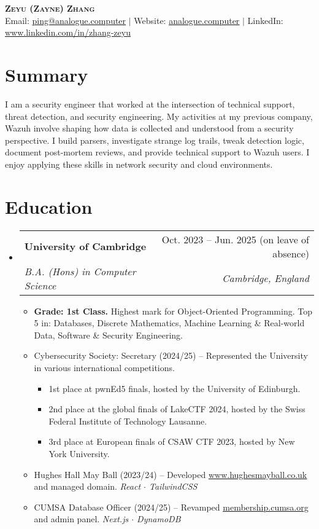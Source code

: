 \documentclass[letterpaper,10pt]{article}
\makeatletter
\newcommand{\link}[2]{\href{#1}{\color{blue}\underline{#2}}}
\newcommand{\resumeItem}[1]{
  \item\small{
    {#1 \vspace{-2pt}}
  }
}
\newcommand{\resumeSubheading}[4]{
  \vspace{-2pt}\item
  \begin{tabular*}{0.97\textwidth}[t]{l@{\extracolsep{\fill}}r}
    \textbf{#1} & #2 \\
    \textit{\small#3} & \textit{\small #4} \\
  \end{tabular*}\vspace{-7pt}
}
\newenvironment{resumeSubHeadingList}{\begin{itemize}[leftmargin=0.15in, label={}]}{\end{itemize}}
\newenvironment{resumeItemList}{\begin{itemize}}{\end{itemize}}
\newenvironment{resumeItemSubList}{\begin{itemize}\setlength\itemsep{0.4em}}{\end{itemize}\vspace{-5pt}}
\makeatother
\begin{document}
\begin{center}
  \textbf{\huge \scshape Zeyu (Zayne) Zhang} \\ \vspace{1pt}
  \small Email: \link{mailto:ping@analogue.computer}{ping@analogue.computer} $|$ Website: \link{https://www.analogue.computer}{analogue.computer} $|$ LinkedIn: \link{https://www.linkedin.com/in/zhang-zeyu}{www.linkedin.com/in/zhang-zeyu}
\end{center}

\section{Summary}
I am a security engineer that worked at the intersection of technical support, threat detection, and security engineering. My activities
at my previous company, Wazuh involve shaping how data is collected and understood from a security perspective. I build parsers, investigate
strange log trails, tweak detection logic, document post-mortem reviews, and provide technical support to Wazuh users. I enjoy applying these
skills in network security and cloud environments.

\section{Education}
\begin{resumeSubHeadingList}
  \resumeSubheading
    {University of Cambridge}{Oct. 2023 -- Jun. 2025 (on leave of absence)}
    {B.A. (Hons) in Computer Science}{Cambridge, England}
    \begin{resumeItemList}
      \resumeItem{\textbf{Grade: 1st Class.}
        Highest mark for Object-Oriented Programming.
        Top 5 in: Databases, Discrete Mathematics, Machine Learning \& Real-world Data, Software \& Security Engineering.}

      \resumeItem{Cybersecurity Society: Secretary (2024/25) -- Represented the
                  University in various international competitions.}

        \begin{resumeItemSubList}
          \resumeItem{1st place at pwnEd5 finals, hosted by the University of Edinburgh.}
          \resumeItem{2nd place at the global finals of LakeCTF 2024, hosted by the Swiss Federal Institute of Technology Lausanne.}
          \resumeItem{3rd place at European finals of CSAW CTF 2023, hosted by New York University.}
        \end{resumeItemSubList}

      \resumeItem{Hughes Hall May Ball (2023/24) -- Developed \link{https://www.hughesmayball.co.uk}{www.hughesmayball.co.uk} and managed
       domain. \textit{React $\cdot$ TailwindCSS} }
      \resumeItem{CUMSA Database Officer (2024/25) -- Revamped \link{https://membership.cumsa.org/}{membership.cumsa.org} and admin panel.
       \textit{Next.js $\cdot$ DynamoDB} }
    \end{resumeItemList}
\end{resumeSubHeadingList}
\end{document}
